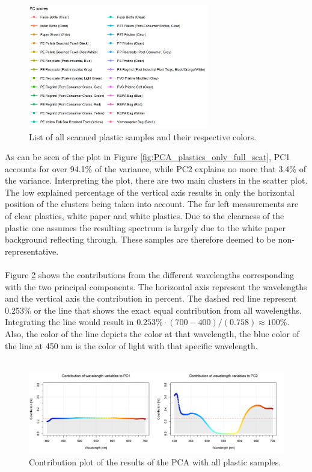 \begin{figure}[H]
   \centering
    \includegraphics[width=0.7\textwidth]{Images/results/PCA_plastics_full_list.png}
  \caption{List of all scanned plastic samples and their respective colors.}
  \label{fig:PCA_plastics_full_list}
\end{figure}
\noindent
As can be seen of the plot in Figure \ref{fig:PCA_plastics_only_full_scat}, PC1 accounts for over 94.1\% of the variance, while PC2 explains no more that 3.4\% of the variance. Interpreting the plot, there are two main clusters in the scatter plot. The low explained percentage of the vertical axis results in only the horizontal position of the clusters being taken into account. The far left measurements are of clear plastics, white paper and white plastics. Due to the clearness of the plastic one assumes the resulting spectrum is largely due to the white paper background reflecting through. These samples are therefore deemed to be non-representative.
\\\\
Figure \ref{fig:PCA_plastics_full_doub_cont} shows the contributions from the different wavelengths corresponding with the two principal components. The horizontal axis represent the wavelengths and the vertical axis the contribution in percent. The dashed red line represent 0.253\% or the line that shows the exact equal contribution from all wavelengths. Integrating the line would result in $0.253\% \cdot (700 - 400)/(0.758) \approx 100\%$. Also, the color of the line depicts the color at that wavelength, the blue color of the line at 450 nm is the color of light with that specific wavelength. 
\\\\
\begin{figure}[H]
    \centering
    \includegraphics[width=1\textwidth]{Images/results/PCA_plastics_full_doub_cont.png}
    \caption{Contribution plot of the results of the PCA with all plastic samples.}
    \label{fig:PCA_plastics_full_doub_cont}
\end{figure}
